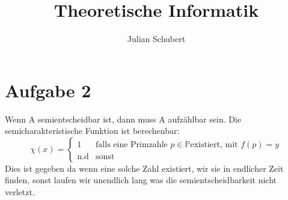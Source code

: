 \documentclass[14pt]{article}
\title{Theoretische Informatik}
\author{Julian Schubert}
\begin{document}
\section*{Aufgabe 2}
Wenn A semientscheidbar ist, dann muss A aufzählbar sein.
Die semicharakteristische Funktion ist berechenbar:
\begin{equation*}
    \chi (x) =
    \begin{cases}
        1                 & \text{falls eine Primzahle $p \in \mathbb{P}$
        existiert, mit $f(p) = y$}             \\
        \text{n.d}                   & \text{sonst}
    \end{cases}
\end{equation*}
Dies ist gegeben da wenn eine solche Zahl existiert, wir sie in 
endlicher Zeit finden, sonst laufen wir unendlich lang was die 
semientscheidbarkeit nicht verletzt.
\end{document}

